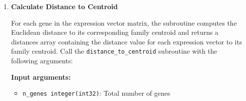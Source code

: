 \begin{enumerate}
\begin{itemize}
            \item \texttt{n\_axes integer(int32)}: Number of axes (tissues /
                  dimensions)
                  
            \item \texttt{n\_genes integer(int32)}: Total number of genes
                  
            \item \texttt{gene\_indices integer(int32)}: An array containing the
                  column indices of the selected genes in \texttt{expression\_vectors}
                  
            \item \texttt{n\_selected\_genes integer(int32)}: Total number of genes
                  in the current family to be calculated
          \end{itemize}
          
          \textbf{Output arguments:}
          \begin{itemize}
            \item \texttt{centroid real(real64):} Calculated mean vector (centroid)
                  with length of \texttt{n\_axes}
                  
            \item \texttt{ierr integer(int32)}: Error code (for error details
                  please check \hyperref[sec:error-handling]{error handling section}
                  )
          \end{itemize}
          \begin{lstlisting}[language=Fortran, caption={Mean Vector Calculation}]
call mean_vector(expression_vectors, n_axes, n_genes, gene_indices,&
         n_selected_genes, centroid, ierr)
          \end{lstlisting}
          
    \item \textbf{Calculate Distance to Centroid}
          
          For each gene in the expression vector matrix, the subroutine computes
          the Euclidean distance to its corresponding family centroid and
          returns a distances array containing the distance value for each
          expression vector to its family centroid. Call the \texttt{distance\_to\_centroid}
          subroutine with the following arguments:
          
          \textbf{Input arguments:}
          \begin{itemize}
            \item \texttt{n\_genes integer(int32)}: Total number of genes
                  

\end{itemize}
\end{enumerate}
